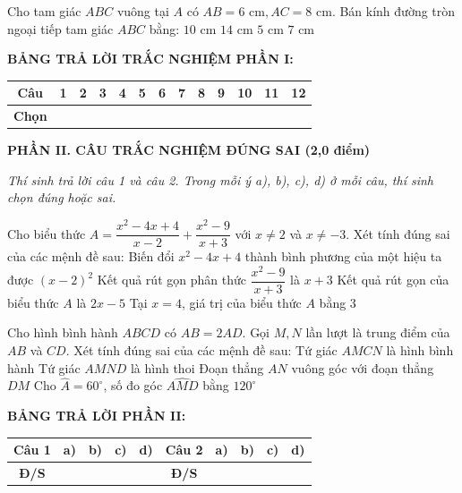 \documentclass[12pt,a4paper]{article}
\begin{document}
\begin{ex}
Cho tam giác $ABC$ vuông tại $A$ có $AB = 6\text{ cm}, AC = 8\text{ cm}$. Bán kính đường tròn ngoại tiếp tam giác $ABC$ bằng:
\choice
{$10\text{ cm}$}
{$14\text{ cm}$}
{\True $5\text{ cm}$}
{$7\text{ cm}$}
\end{ex}


\vspace{1mm}
\noindent\textbf{BẢNG TRẢ LỜI TRẮC NGHIỆM PHẦN I:}
\begin{center}
\begin{tabular}{|c|c|c|c|c|c|c|c|c|c|c|c|c|}
\hline
\textbf{Câu} & \textbf{1} & \textbf{2} & \textbf{3} & \textbf{4} & \textbf{5} & \textbf{6} & \textbf{7} & \textbf{8} & \textbf{9} & \textbf{10} & \textbf{11} & \textbf{12} \\
\hline
\textbf{Chọn} & \rule{0pt}{0.65cm} & & & & & & & & & & & \\
\hline
\end{tabular}
\end{center}
\vspace{2mm}

\setcounter{ex}{0}
\noindent\textbf{\large PHẦN II. CÂU TRẮC NGHIỆM ĐÚNG SAI (2,0 điểm)}

\textit{Thí sinh trả lời câu 1 và câu 2. Trong mỗi ý a), b), c), d) ở mỗi câu, thí sinh chọn đúng hoặc sai.}

\vspace{1mm}
\begin{ex}
Cho biểu thức $A = \dfrac{x^2 - 4x + 4}{x - 2} + \dfrac{x^2 - 9}{x + 3}$ với $x \neq 2$ và $x \neq -3$. Xét tính đúng sai của các mệnh đề sau:
\choiceTF
{\True Biến đổi $x^2 - 4x + 4$ thành bình phương của một hiệu ta được $(x - 2)^2$}
{Kết quả rút gọn phân thức $\dfrac{x^2 - 9}{x + 3}$ là $x + 3$}
{\True Kết quả rút gọn của biểu thức $A$ là $2x - 5$}
{\True Tại $x = 4$, giá trị của biểu thức $A$ bằng $3$}
\end{ex}

\begin{ex}
Cho hình bình hành $ABCD$ có $AB = 2AD$. Gọi $M, N$ lần lượt là trung điểm của $AB$ và $CD$. Xét tính đúng sai của các mệnh đề sau:
\choiceTF
{\True Tứ giác $AMCN$ là hình bình hành}
{\True Tứ giác $AMND$ là hình thoi}
{\True Đoạn thẳng $AN$ vuông góc với đoạn thẳng $DM$}
{Cho $\widehat{A} = 60^\circ$, số đo góc $\widehat{AMD}$ bằng $120^\circ$}
\end{ex}


\noindent\textbf{BẢNG TRẢ LỜI PHẦN II:}
\begin{center}
\begin{tabular}{|c|c|c|c|c||c|c|c|c|c|}
\hline
\textbf{Câu 1} & \textbf{a)} & \textbf{b)} & \textbf{c)} & \textbf{d)} & \textbf{Câu 2} & \textbf{a)} & \textbf{b)} & \textbf{c)} & \textbf{d)} \\
\hline
\textbf{Đ/S} & \rule{0pt}{0.6cm} & & & & \textbf{Đ/S} & & & & \\
\hline
\end{tabular}
\end{center}
\vspace{2mm}
\end{document}
